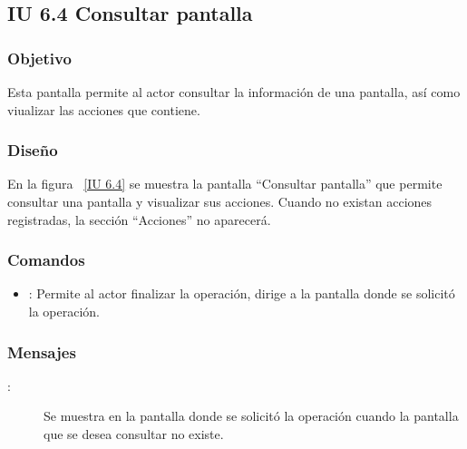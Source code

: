 \subsection{IU 6.4 Consultar pantalla}

\subsubsection{Objetivo}
	
	Esta pantalla permite al actor consultar la información de una pantalla, así como viualizar las acciones que contiene.

\subsubsection{Diseño}

    En la figura ~\ref{IU 6.4} se muestra la pantalla ``Consultar pantalla'' que permite consultar una pantalla y visualizar sus acciones. Cuando no existan acciones registradas, la sección ``Acciones'' no aparecerá. \\



\subsubsection{Comandos}
\begin{itemize}
	\item {}: Permite al actor finalizar la operación, dirige a la pantalla donde se solicitó la operación.
\end{itemize}

\subsubsection{Mensajes}
	
\begin{description}
	\item[:] Se muestra en la pantalla donde se solicitó la operación cuando la pantalla que se desea consultar no existe.
\end{description}

